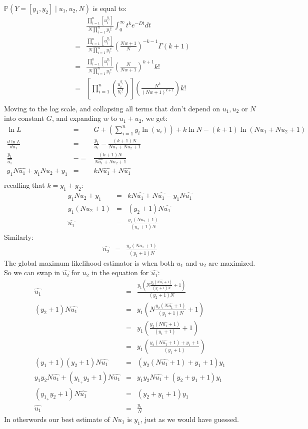 \documentclass[11pt]{article}
\renewcommand{\Pr}{\mathbb{P}}
\begin{document}
$\Pr(Y=[y_1, y_2] \mid u_1, u_2, N)$ is equal to:
\begin{eqnarray*}
 & &  \frac{\prod_{i=1}^{n}\left[u_i^{y_i}\right]}{N\prod_{i=1}^{n} y_i!} 
\int_{0}^{\infty}  t^ke^{-D t} dt \\
& = & \frac{\prod_{i=1}^{n}\left[u_i^{y_i}\right]}{N\prod_{i=1}^{n} y_i!} \left(\frac{Nw + 1}{N}\right)^{-k-1}\Gamma(k+1) \\
& = &
\frac{\prod_{i=1}^{n}\left[u_i^{y_i}\right]}{N\prod_{i=1}^{n} y_i!} \left(\frac{N}{Nw + 1}\right)^{k+1} k! \\
& = &
\left[\prod_{i=1}^{n}\left(\frac{u_i^{y_i}}{y_i!}\right)\right] \left(\frac{N^k}{(Nw + 1)^{k+1}}\right) k! \\
\end{eqnarray*}
Moving to the log scale, and collapsing all terms that don't depend on $u_1, u_2$ or $N$ into constant $G$, and expanding $w$ to $u_1 + u_2$,  we get:
\begin{eqnarray*}
\ln L & = & G + \left(\sum_{i=1}^n y_i\ln(u_i)\right) + k\ln N - (k+1)\ln(Nu_1 + Nu_2 + 1)  \\
\frac{d \ln L}{d u_1} & = & \frac{y_1}{u_1} - \frac{(k+1)N}{Nu_1 + N u_2 + 1} \\
 \frac{y_1}{\hat{u_1}} & -= & \frac{(k+1)N}{N\hat{u_1} + N u_2 + 1} \\
 y_1 N\hat{u_1} + y_1 N u_2 + y_1 & = & k N \hat{u_1} + N \hat{u_1} \\
\end{eqnarray*}
recalling that $k= y_1 + y_2$:
\begin{eqnarray*}
 y_1 N u_2 + y_1 & = & k N \hat{u_1} + N \hat{u_1} - y_1 N\hat{u_1} \\
 y_1 (N u_2 + 1) & = & (y_2 + 1) N \hat{u_1} \\
 \hat{u_1} & = & \frac{ y_1 (N u_2 + 1)}{(y_2 + 1) N }
\end{eqnarray*}
Similarly:
\begin{eqnarray*}
 \hat{u_2} & = & \frac{ y_2 (N u_1 + 1)}{(y_1 + 1) N }
\end{eqnarray*}
The global maximum likelihood estimator is when both $u_1$ and $u_2$ are maximized.
So we can swap in $\hat{u_2}$ for ${u_2}$ in the equation for $ \hat{u_1}$:
\begin{eqnarray*}
\hat{u_1} & = & \frac{ y_1 \left(N \frac{ y_2 (N \hat{u_1} + 1)}{(y_1 + 1) N } + 1\right)}{(y_2 + 1) N } \\
(y_2 + 1) N \hat{u_1} & = & y_1 \left(N \frac{ y_2 (N \hat{u_1} + 1)}{(y_1 + 1) N } + 1\right) \\
& = & y_1 \left(\frac{ y_2 (N \hat{u_1} + 1)}{(y_1 + 1) } + 1\right) \\
& = & y_1 \left(\frac{ y_2 (N \hat{u_1}+ 1) + y_1 + 1}{(y_1 + 1) }\right) \\
(y_1 + 1)(y_2 + 1) N \hat{u_1} & = & (y_2 (N \hat{u_1} + 1) + y_1 + 1) y_1 \\
y_1 y_2 N \hat{u_1} + (y_1 _+ y_2 + 1) N \hat{u_1} & = & y_1 y_2 N \hat{u_1} + (y_2 + y_1 + 1) y_1 \\
(y_1 _+ y_2 + 1) N \hat{u_1} & = &  (y_2 + y_1 + 1) y_1 \\
\hat{u_1} & = & \frac{y_1}{N}
\end{eqnarray*}
In otherwords our best estimate of $Nu_1$ is $y_1$, just as we would have guessed.
\end{document}
